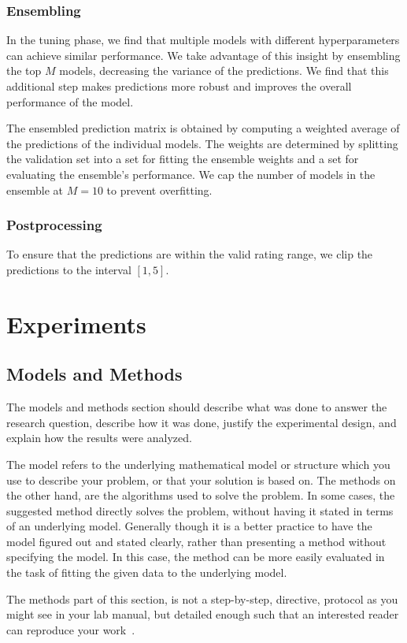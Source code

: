 \documentclass[10pt,conference,compsocconf]{IEEEtran}
\begin{document}
\subsubsection{Ensembling}
In the tuning phase, we find that multiple models with different hyperparameters can achieve similar performance.
We take advantage of this insight by ensembling the top $M$ models, decreasing the variance of the predictions.
We find that this additional step makes predictions more robust and improves the overall performance of the model.

The ensembled prediction matrix is obtained by computing a weighted average of the predictions of the individual models.
The weights are determined by splitting the validation set into a set for fitting the ensemble weights and a set for evaluating the ensemble's performance.
We cap the number of models in the ensemble at $M=10$ to prevent overfitting.
\subsubsection{Postprocessing}
To ensure that the predictions are within the valid rating range, we clip the predictions to the interval $[1, 5]$.

\section{Experiments}


\subsection{Models and Methods}
The models and methods
section should describe what was
done to answer the research question, describe how it was done,
justify the experimental design, and
explain how the results were analyzed.

The model refers to the underlying mathematical model or structure which 
you use to describe your problem, or that your solution is based on. 
The methods on the other hand, are the algorithms used to solve the problem. 
In some cases, the suggested method directly solves the problem, without having it 
stated in terms of an underlying model. Generally though it is a better practice to have 
the model figured out and stated clearly, rather than presenting a method without specifying 
the model. In this case, the method can be more easily evaluated in the task of fitting 
the given data to the underlying model.

The methods part of this section, is not a step-by-step, directive,
protocol as you might see in your lab manual, but detailed enough such
that an interested reader can reproduce your
work~\cite{anderson04,wavelab}.
\end{document}
